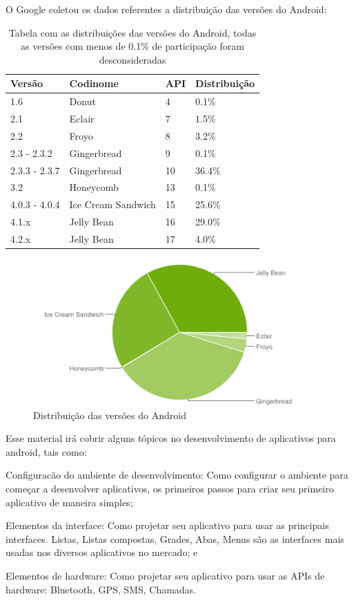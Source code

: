 \documentclass[a4paper,12pt,brazil]{book}
\begin{document}
O Google coletou os dados referentes a distribuição das versões do Android:
\begin{table}[H]
\centering
    \begin{tabular}{|l|l|l|l|}
     \rowcolor{Gray} \hline 
    Versão        & Codinome           & API & Distribuição \\ \hline
    1.6           & Donut              & 4   & 0.1\%        \\ \hline
    2.1           & Eclair             & 7   & 1.5\%        \\ \hline
    2.2           & Froyo              & 8   & 3.2\%        \\ \hline
    2.3 - 2.3.2   & Gingerbread        & 9   & 0.1\%        \\ \hline
    2.3.3 - 2.3.7 & Gingerbread        & 10  & 36.4\%       \\ \hline
    3.2           & Honeycomb          & 13  & 0.1\%        \\ \hline
    4.0.3 - 4.0.4 & Ice Cream Sandwich & 15  & 25.6\%       \\ \hline
    4.1.x         & Jelly Bean         & 16  & 29.0\%       \\ \hline
    4.2.x         & Jelly Bean         & 17  & 4.0\%        \\ \hline
    \end{tabular}
    \caption{Tabela com as distribuições das versões do Android, todas as versões com menos de 0.1\% de participação foram desconsideradas}
\end{table}

\begin{figure}[H]
  \centering
  \includegraphics[width=.85\textwidth]{figuras/chart.png}
  \caption{Distribuição das versões do Android}
  \label{fig:d}
\end{figure}

\newpage
Esse material irá cobrir alguns tópicos no desenvolvimento de aplicativos para android, tais como:
\bi
\item
Configuracão do ambiente de desenvolvimento: Como configurar o ambiente para começar a desenvolver aplicativos, os primeiros passos para criar seu primeiro aplicativo de maneira simples;
\item
Elementos da interface: Como projetar seu aplicativo para usar as principais interfaces. Listas, Listas compostas, Grades, Abas, Menus são as interfaces mais usadas nos diversos aplicativos no mercado; e
\item
Elementos de hardware: Como projetar seu aplicativo para usar as APIs de hardware: Bluetooth, GPS, SMS, Chamadas.
\ei
\end{document}
